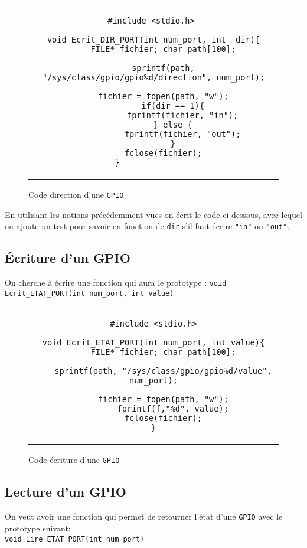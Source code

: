 \documentclass[11pt, openright]{book}
\begin{document}
\begin{figure}[ht!]
	\centering
	\begin{tabular}{c}
		\begin{lstlisting}
#include <stdio.h> 

void Ecrit_DIR_PORT(int num_port, int  dir){
    FILE* fichier; char path[100];

    sprintf(path, "/sys/class/gpio/gpio%d/direction", num_port);

    fichier = fopen(path, "w");
        if(dir == 1){
            fprintf(fichier, "in");
        } else {
            fprintf(fichier, "out");
        }
    fclose(fichier);
}				
				\end{lstlisting}
	\end{tabular}
	\caption{Code direction d'une \texttt{GPIO}}
\end{figure}

En utilisant les notions précédemment vues on écrit le code ci-dessous, avec lequel on ajoute un test pour savoir en fonction de \texttt{dir} s'il faut écrire \texttt{"in"} ou \texttt{"out"}.

\subsection{Écriture d'un GPIO}

On cherche à écrire une fonction qui aura le prototype : \texttt{void Ecrit\_ETAT\_PORT(int num\_port, int value)}

\begin{figure}[ht!]
	\centering
	\begin{tabular}{c}
		\begin{lstlisting}
#include <stdio.h>

void Ecrit_ETAT_PORT(int num_port, int value){
    FILE* fichier; char path[100];

    sprintf(path, "/sys/class/gpio/gpio%d/value", num_port);

    fichier = fopen(path, "w");
        fprintf(f,"%d", value);
    fclose(fichier);
}
				\end{lstlisting}
	\end{tabular}
	\caption{Code écriture d'une \texttt{GPIO} }
\end{figure}

\subsection{Lecture d'un GPIO}

On veut avoir une fonction qui permet de retourner l'état d'une \texttt{GPIO} avec le prototype suivant:\\ \texttt{void Lire\_ETAT\_PORT(int num\_port)}
\end{document}
